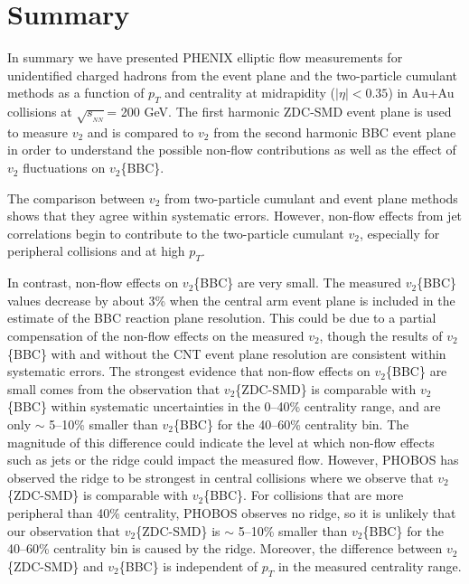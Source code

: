 \documentclass[aps,prc,superscriptaddress,showpacs,floatfix,twocolumn]{revtex4}
\newcommand \pt{\mbox{$p_T$}\xspace}
\newcommand \sqsn{\mbox{$\sqrt{s_{_{NN}}}$}\xspace}
\newcommand \Au{{Au+Au}\xspace}
\begin{document}
\section{Summary\label{sec:conclusion}}


In summary we have presented PHENIX elliptic flow measurements for 
unidentified charged hadrons from the event plane and the 
two-particle cumulant methods as a function of \pt and centrality at 
midrapidity ($|\eta| < 0.35$) in \Au collisions at \sqsn = 200 GeV. 
The first harmonic ZDC-SMD event plane is used to measure $v_2$ and 
is compared to $v_2$ from the second harmonic BBC event plane in 
order to understand the possible non-flow contributions as well as 
the effect of $v_2$ fluctuations on $v_2$\{BBC\}.

The comparison between $v_2$ from two-particle cumulant and event 
plane methods shows that they agree within systematic errors. 
However, non-flow effects from jet correlations begin to contribute 
to the two-particle cumulant $v_2$, especially for peripheral 
collisions and at high \pt.

In contrast, non-flow effects on $v_2$\{BBC\} are very small. 
The measured $v_2$\{BBC\} values decrease by about 3\% when the 
central arm event plane is included in the estimate of the BBC 
reaction plane resolution.  This could be due to a partial 
compensation of the non-flow effects on the measured $v_2$, 
though the results of $v_2$\{BBC\} with and without the CNT 
event plane resolution are consistent within systematic errors. 
The strongest evidence that non-flow effects on $v_2$\{BBC\} are 
small comes from the observation that $v_2$\{ZDC-SMD\} is 
comparable with $v_2$\{BBC\} within systematic uncertainties in 
the 0--40\% centrality range, and are only $\sim$ 5--10\% 
smaller than $v_2$\{BBC\} for the 40--60\% centrality bin. The 
magnitude of this difference could indicate the level at which 
non-flow effects such as jets or the ridge could impact the 
measured flow. However, PHOBOS has observed the ridge to be 
strongest in central collisions\cite{Alver:2009id} where we 
observe that $v_2$\{ZDC-SMD\} is comparable with $v_2$\{BBC\}. 
For collisions that are more peripheral than 40\% centrality, 
PHOBOS observes no ridge\cite{Alver:2009id}, so it is unlikely 
that our observation that $v_2$\{ZDC-SMD\} is $\sim$ 5--10\% 
smaller than $v_2$\{BBC\} for the 40--60\% centrality bin is 
caused by the ridge. Moreover, the difference between 
$v_2$\{ZDC-SMD\} and $v_2$\{BBC\} is independent of \pt in the 
measured centrality range.
\end{document}
